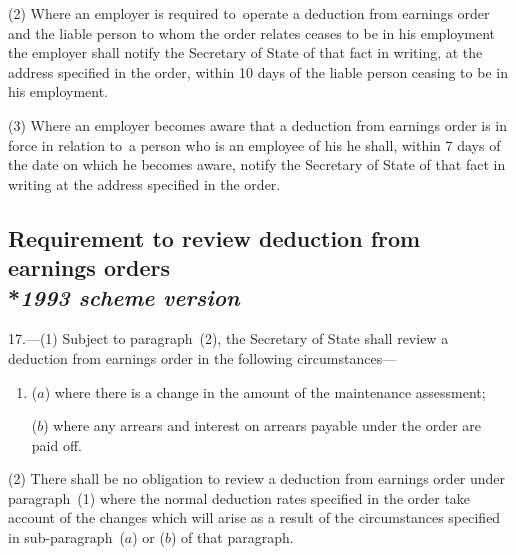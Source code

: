 \documentclass[12pt,a4paper]{article}
\begin{document}
(2) Where an employer is required to~operate a deduction from earnings order and the liable person to whom the order relates ceases to be in his employment the employer shall notify the Secretary of State of that fact in writing, at the address specified in the order, within 10 days of the liable person ceasing to be in his employment.

(3) Where an employer becomes aware that a deduction from earnings order is in force in relation to~a person who is an employee of his he shall, within 7 days of the date on which he becomes aware, notify the Secretary of State of that fact in writing at the address specified in the order.

\subsection[17. Requirement to review deduction from earnings orders --- \emph{1993 scheme version}]{Requirement to review deduction from earnings orders\\*\emph{1993 scheme version}}

%

17.—(1) Subject to paragraph~(2), the Secretary of State shall review a deduction from earnings order in the following circumstances—
\begin{enumerate}\item[]
($a$) where there is a change in the amount of the maintenance assessment;

($b$) where any arrears and interest on arrears payable under the order are paid off.
\end{enumerate}

(2) There shall be no obligation to review a deduction from earnings order under paragraph~(1) where the normal deduction rates specified in the order take account of the changes which will arise as a result of the circumstances specified in sub-paragraph~($a$) or ($b$) of that paragraph.

\end{document}
